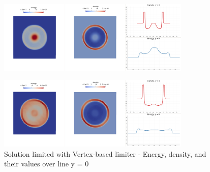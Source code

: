 	\begin{figure}[H]
		\begin{center}
			\includegraphics[width=0.82\textwidth]{img/limit/l5.jpg}
		\end{center}
	\end{figure}\vspace{-12mm}
	\begin{figure}[H]
		\begin{center}
			\includegraphics[width=0.82\textwidth]{img/limit/l6.jpg}
			\caption{Solution limited with Vertex-based limiter - Energy, density, and their values over line y = 0}
		\end{center}
	\end{figure}
